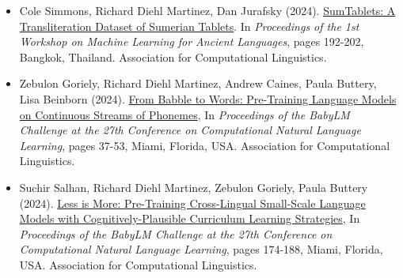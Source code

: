 \begin{tcolorbox}
\begin{itemize}
    \item Cole Simmons, Richard Diehl Martinez, Dan Jurafsky (2024). {\color{thesisblue}\href{https://aclanthology.org/2024.ml4al-1.20/}{SumTablets: A Transliteration Dataset of Sumerian Tablets}}. In \emph{Proceedings of the 1st Workshop on Machine Learning for Ancient Languages}, pages 192-202, Bangkok, Thailand. Association for Computational Linguistics.
    \item Zebulon Goriely, Richard Diehl Martinez, Andrew Caines, Paula Buttery, Lisa Beinborn (2024). {\color{thesisblue}\href{https://aclanthology.org/2024.conll-babylm.4/}{From Babble to Words: Pre-Training Language Models on Continuous Streams of Phonemes}}, In \emph{Proceedings of the BabyLM Challenge at the 27th Conference on Computational Natural Language Learning}, pages 37-53, Miami, Florida, USA. Association for Computational Linguistics.
    \item Suchir Salhan, Richard Diehl Martinez, Zebulon Goriely, Paula Buttery (2024). {\color{thesisblue}\href{https://aclanthology.org/2024.conll-babylm.15/}{Less is More: Pre-Training Cross-Lingual Small-Scale Language Models with Cognitively-Plausible Curriculum Learning Strategies}}, In \emph{Proceedings of the BabyLM Challenge at the 27th Conference on Computational Natural Language Learning}, pages 174-188, Miami, Florida, USA. Association for Computational Linguistics.
\end{itemize}
\end{tcolorbox}